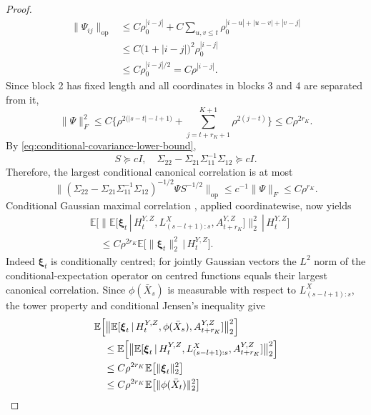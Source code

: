 \documentclass[12pt]{article}
\def\E{\mathbb{E}}
\newcommand\given{\,|\,}
\numberwithin{equation}{section}
\begin{document}
\begin{proof}
\begin{align*}
 \|\Psi_{ij}\|_{\mathrm{op}}
 &\leq C\rho_0^{|i-j|}
   +C\sum_{u,v\leq t}
       \rho_0^{|i-u|+|u-v|+|v-j|}\\
 &\leq C\big(1+|i-j|\big)^2\rho_0^{|i-j|}\\
 &\leq C\rho_0^{|i-j|/2}
  = C\rho^{|i-j|}.
\end{align*}
Since block 2 has fixed
length and all coordinates in blocks 3 and 4 are separated from it,
\begin{equation}\label{eq:source-cross-covariance}
 \|\Psi\|_F^2
 \leq C\Big\{\rho^{2\big(|s-t|-l+1\big)}+
                    \sum_{j=t+r_K+1}^{K+1}\rho^{2(j-t)}\Big\}
 \leq C\rho^{2r_K}.
\end{equation}
By \eqref{eq:conditional-covariance-lower-bound},
\[
 S\succeq cI,\quad
 \Sigma_{22}-\Sigma_{21}\Sigma_{11}^{-1}\Sigma_{12}\succeq cI.
\]
Therefore, the largest conditional canonical correlation is at most
\begin{equation}\label{eq:canonical-bound}
 \|(\Sigma_{22}-\Sigma_{21}\Sigma_{11}^{-1}\Sigma_{12})^{-1/2}
           \Psi S^{-1/2}\|_{\mathrm{op}}
 \leq c^{-1}\|\Psi\|_F\leq C\rho^{r_K}.
\end{equation}
Conditional Gaussian maximal correlation \citep{veraar2009correlation}, applied
coordinatewise, now yields
\begin{align*}
 &\E \Big[\big\|\E[\boldsymbol\xi_t\given H_t^{Y,Z},
 L^X_{(s-l+1):s},A_{t+r_K}^{Y,Z}]\big\|_2^2\given H_t^{Y,Z}\Big]\\
 &\quad\leq C\rho^{2r_K}\E\big[\|\boldsymbol\xi_t\|_2^2\given H_t^{Y,Z}\big].
\end{align*}
Indeed $\boldsymbol\xi_t$ is conditionally centred; for jointly Gaussian
vectors the $L^2$ norm of the conditional-expectation operator on centred
functions equals their largest canonical correlation. Since
$\phi(\bar X_s)$ is measurable with respect to $L^X_{(s-l+1):s}$,
the tower property and conditional Jensen's inequality give
\begin{align}\label{eq:source-one-pair}
 &\E \Big[\big\|\E[\boldsymbol\xi_t\given H_t^{Y,Z},
                  \phi(\bar X_s),A_{t+r_K}^{Y,Z}]\big\|_2^2\Big]\notag\\
 &\quad\leq\E \Big[\big\|\E[\boldsymbol\xi_t\given H_t^{Y,Z},
                  L^X_{(s-l+1):s},A_{t+r_K}^{Y,Z}]\big\|_2^2\Big]\notag\\
 &\quad\leq C\rho^{2r_K}\E\big[\|\boldsymbol\xi_t\|_2^2\big] \notag\\
 &\quad\leq C\rho^{2r_K}\E\big[\|\phi(\bar X_t)\|_2^2\big]\notag \\

\end{align}
\end{proof}
\end{document}
